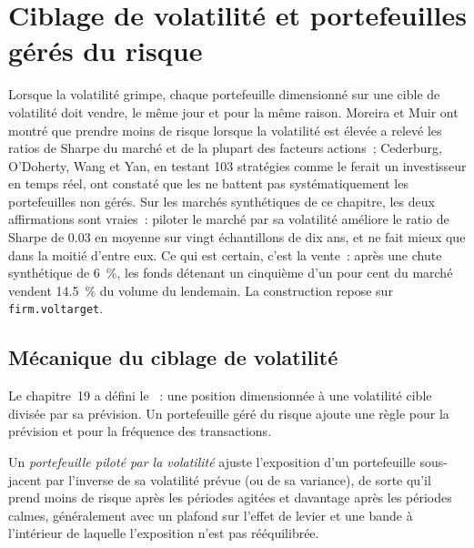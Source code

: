 \chapter{Ciblage de volatilité et portefeuilles gérés du risque}\label{ch:s1:volatility-targeting-and-risk-managed-portfolios}

Lorsque la volatilité grimpe, chaque portefeuille dimensionné sur une cible de volatilité doit vendre, le même jour et pour la même raison. Moreira et Muir ont montré
que prendre moins de risque lorsque la volatilité est élevée a relevé les ratios de Sharpe du marché et de la plupart des facteurs actions~; Cederburg, O'Doherty, Wang et Yan,
en testant 103 stratégies comme le ferait un investisseur en temps réel, ont constaté que les  ne battent pas systématiquement les portefeuilles non gérés. Sur
les marchés synthétiques de ce chapitre, les deux affirmations sont vraies~: piloter le marché par sa volatilité améliore le ratio de Sharpe de 0.03 en moyenne sur vingt
échantillons de dix ans, et ne fait mieux que dans la moitié d'entre eux. Ce qui est certain, c'est la vente~: après une chute synthétique de 6~\%, les fonds détenant un cinquième d'un pour cent
du marché vendent 14.5~\% du volume du lendemain. La construction repose sur \texttt{firm.voltarget}.

\section{Mécanique du ciblage de volatilité}

Le chapitre~19 a défini le ~: une position dimensionnée à une volatilité cible divisée par sa prévision. Un portefeuille géré du risque ajoute une règle
pour la prévision et pour la fréquence des transactions.

\begin{definition}\label{def:s1:volatility-targeting-and-risk-managed-portfolios:managed}
Un \emph{portefeuille piloté par la volatilité} ajuste l'exposition d'un portefeuille sous-jacent par l'inverse de sa volatilité prévue
(ou de sa variance), de sorte qu'il prend moins de risque après les périodes agitées et davantage après les périodes calmes, généralement avec un plafond sur l'effet de levier et une bande
à l'intérieur de laquelle l'exposition n'est pas rééquilibrée.
\end{definition}

